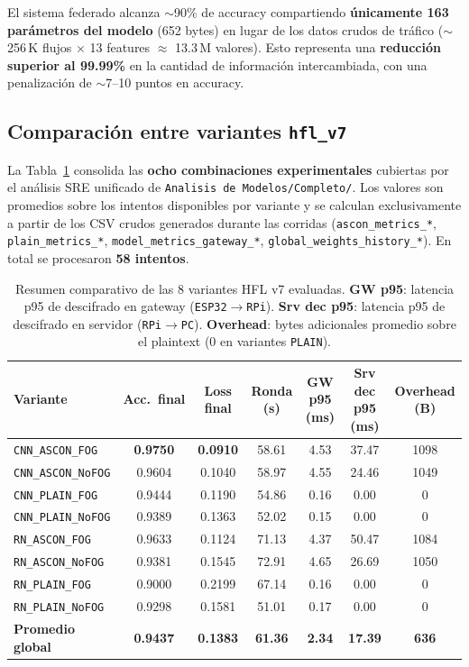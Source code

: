 El sistema federado alcanza $\sim$90\% de accuracy compartiendo \textbf{únicamente 163 parámetros del modelo} (652 bytes) en lugar de los datos crudos de tráfico ($\sim$256\,K flujos $\times$ 13 features $\approx$ 13.3\,M valores). Esto representa una \textbf{reducción superior al 99.99\%} en la cantidad de información intercambiada, con una penalización de $\sim$7--10 puntos en accuracy.

\subsection{Comparación entre variantes \texttt{hfl\_v7}}

La Tabla~\ref{tab:variants_results} consolida las \textbf{ocho combinaciones experimentales} cubiertas por el análisis SRE unificado de \texttt{Analisis de Modelos/Completo/}. Los valores son promedios sobre los intentos disponibles por variante y se calculan exclusivamente a partir de los CSV crudos generados durante las corridas (\texttt{ascon\_metrics\_*}, \texttt{plain\_metrics\_*}, \texttt{model\_metrics\_gateway\_*}, \texttt{global\_weights\_history\_*}). En total se procesaron \textbf{58 intentos}.

\begin{table}[H]
\centering
\caption{Resumen comparativo de las 8 variantes HFL v7 evaluadas. \textbf{GW p95}: latencia p95 de descifrado en gateway (\texttt{ESP32$\to$RPi}). \textbf{Srv dec p95}: latencia p95 de descifrado en servidor (\texttt{RPi$\to$PC}). \textbf{Overhead}: bytes adicionales promedio sobre el plaintext (0 en variantes \texttt{PLAIN}).}
\label{tab:variants_results}
\scriptsize
\setlength{\tabcolsep}{4.5pt}
\begin{tabular}{l  c c c c c c}
\toprule
\textbf{Variante}  & \textbf{Acc.\ final} & \textbf{Loss final} & \textbf{Ronda (s)} & \textbf{GW p95 (ms)} & \textbf{Srv dec p95 (ms)} & \textbf{Overhead (B)} \\
\midrule
\texttt{CNN\_ASCON\_FOG}    & \textbf{0.9750} & \textbf{0.0910} & 58.61 & 4.53 & 37.47 & 1098 \\
\texttt{CNN\_ASCON\_NoFOG}   & 0.9604 & 0.1040 & 58.97 & 4.55 & 24.46 & 1049 \\
\texttt{CNN\_PLAIN\_FOG}    & 0.9444 & 0.1190 & 54.86 & 0.16 &  0.00 &    0 \\
\texttt{CNN\_PLAIN\_NoFOG}   & 0.9389 & 0.1363 & 52.02 & 0.15 &  0.00 &    0 \\
\texttt{RN\_ASCON\_FOG}    & 0.9633 & 0.1124 & 71.13 & 4.37 & 50.47 & 1084 \\
\texttt{RN\_ASCON\_NoFOG}   & 0.9381 & 0.1545 & 72.91 & 4.65 & 26.69 & 1050 \\
\texttt{RN\_PLAIN\_FOG}     & 0.9000 & 0.2199 & 67.14 & 0.16 &  0.00 &    0 \\
\texttt{RN\_PLAIN\_NoFOG}    & 0.9298 & 0.1581 & 51.01 & 0.17 &  0.00 &    0 \\
\midrule
\rowcolor{white}\textbf{Promedio global}  & \textbf{0.9437} & \textbf{0.1383} & \textbf{61.36} & \textbf{2.34} & \textbf{17.39} & \textbf{636} \\
\bottomrule
\end{tabular}
\end{table}

